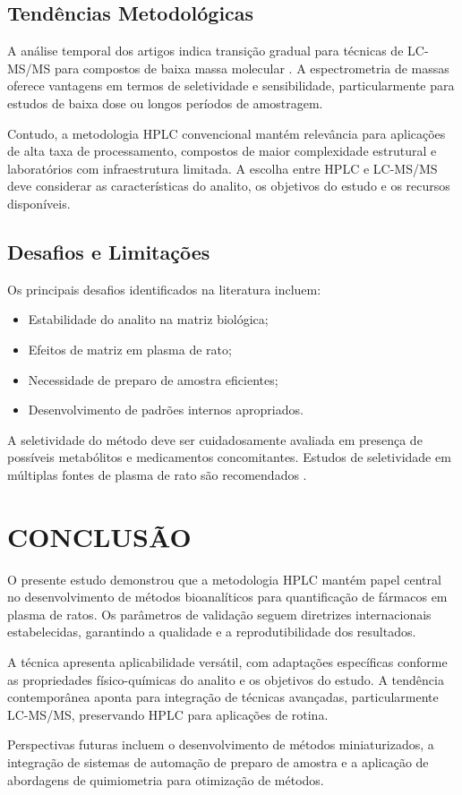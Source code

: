 \subsection{Tendências Metodológicas}

A análise temporal dos artigos indica transição gradual para técnicas de LC-MS/MS para compostos de baixa massa molecular \cite{murray2023}. A espectrometria de massas oferece vantagens em termos de seletividade e sensibilidade, particularmente para estudos de baixa dose ou longos períodos de amostragem.

Contudo, a metodologia HPLC convencional mantém relevância para aplicações de alta taxa de processamento, compostos de maior complexidade estrutural e laboratórios com infraestrutura limitada. A escolha entre HPLC e LC-MS/MS deve considerar as características do analito, os objetivos do estudo e os recursos disponíveis.

\subsection{Desafios e Limitações}

Os principais desafios identificados na literatura incluem:

\begin{itemize}
\item Estabilidade do analito na matriz biológica;
\item Efeitos de matriz em plasma de rato;
\item Necessidade de preparo de amostra eficientes;
\item Desenvolvimento de padrões internos apropriados.
\end{itemize}

A seletividade do método deve ser cuidadosamente avaliada em presença de possíveis metabólitos e medicamentos concomitantes. Estudos de seletividade em múltiplas fontes de plasma de rato são recomendados \cite{ich2005}.

\section{CONCLUSÃO}

O presente estudo demonstrou que a metodologia HPLC mantém papel central no desenvolvimento de métodos bioanalíticos para quantificação de fármacos em plasma de ratos. Os parâmetros de validação seguem diretrizes internacionais estabelecidas, garantindo a qualidade e a reprodutibilidade dos resultados.

A técnica apresenta aplicabilidade versátil, com adaptações específicas conforme as propriedades físico-químicas do analito e os objetivos do estudo. A tendência contemporânea aponta para integração de técnicas avançadas, particularmente LC-MS/MS, preservando HPLC para aplicações de rotina.

Perspectivas futuras incluem o desenvolvimento de métodos miniaturizados, a integração de sistemas de automação de preparo de amostra e a aplicação de abordagens de quimiometria para otimização de métodos.





